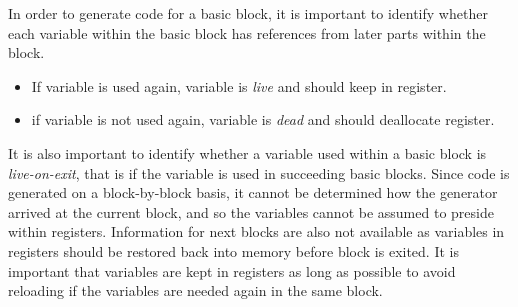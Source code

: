 \begin{definition}
    In order to generate code for a basic block, it is important to identify whether each variable within the basic block has references from later parts within the block.
    \begin{itemize}
        \item If variable is used again, variable is \textit{live} and should keep in register.
        \item if variable is not used again, variable is \textit{dead} and should deallocate register.
    \end{itemize}
    
    It is also important to identify whether a variable used within a basic block is \textit{live-on-exit}, that is if the variable is used in succeeding basic blocks. Since code is generated on a block-by-block basis, it cannot be determined how the generator arrived at the current block, and so the variables cannot be assumed to preside within registers. Information for next blocks are also not available as variables in registers should be restored back into memory before block is exited. It is important that variables are kept in registers as long as possible to avoid reloading if the variables are needed again in the same block.
\end{definition}

